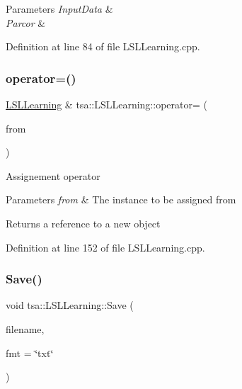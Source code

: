 \begin{DoxyParams}{Parameters}
{\em Input\+Data} & \\
\hline
{\em Parcor} & \\
\hline
\end{DoxyParams}


Definition at line 84 of file L\+S\+L\+Learning.\+cpp.

\mbox{\label{classtsa_1_1_l_s_l_learning_a8b2b47d740bd2207f612e9c4aadaf220}} 
\subsubsection{\texorpdfstring{operator=()}{operator=()}}
{\footnotesize\ttfamily \hyperlink{classtsa_1_1_l_s_l_learning}{L\+S\+L\+Learning} \& tsa\+::\+L\+S\+L\+Learning\+::operator= (\begin{DoxyParamCaption}\item[{const \hyperlink{classtsa_1_1_l_s_l_learning}{L\+S\+L\+Learning} \&}]{from }\end{DoxyParamCaption})}

Assignement operator


\begin{DoxyParams}{Parameters}
{\em from} & The instance to be assigned from\\
\hline
\end{DoxyParams}
\begin{DoxyReturn}{Returns}
a reference to a new object 
\end{DoxyReturn}


Definition at line 152 of file L\+S\+L\+Learning.\+cpp.

\mbox{\label{classtsa_1_1_l_s_l_learning_aa3397a1d3944fb4ce19c612d74e7018a}} 
\subsubsection{\texorpdfstring{Save()}{Save()}}
{\footnotesize\ttfamily void tsa\+::\+L\+S\+L\+Learning\+::\+Save (\begin{DoxyParamCaption}\item[{const char $\ast$}]{filename,  }\item[{const char $\ast$}]{fmt = {\ttfamily \char`\"{}txt\char`\"{}} }\end{DoxyParamCaption})\hspace{0.3cm}{\ttfamily [inline]}}



